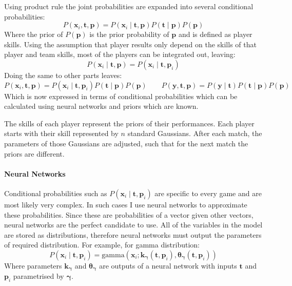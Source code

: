 \documentclass[12pt,a4paper]{book}
\newcommand\bs[1]{\boldsymbol{#1}}
\begin{document}
Using product rule the joint probabilities are expanded into several conditional probabilities:
\begin{equation*}
P(\bs{x}_i,\bs{t},\bs{p}) = P(\bs{x}_i\mid\bs{t},\bs{p})P(\bs{t}\mid\bs{p})P(\bs{p})
\end{equation*}
Where the prior of $P(\bs{p})$ is the prior probability of $\bs{p}$ and is defined as player skills.
Using the assumption that player results only depend on the skills of that player and team skills, most of the players can be integrated out, leaving:
\begin{equation*}
P(\bs{x}_i\mid\bs{t},\bs{p}) = P(\bs{x}_i\mid\bs{t},\bs{p}_i)
\end{equation*}
Doing the same to other parts leaves:
\begin{equation}
P(\bs{x}_i,\bs{t},\bs{p}) = P(\bs{x}_i\mid\bs{t},\bs{p}_i)P(\bs{t}\mid\bs{p})P(\bs{p})\qquad
P(\bs{y},\bs{t},\bs{p}) = P(\bs{y}\mid\bs{t})P(\bs{t}\mid\bs{p})P(\bs{p})
\label{eq:split-conditionals}
\end{equation}
Which is now expressed in terms of conditional probabilities which can be calculated using neural networks and priors which are known.

The skills of each player represent the priors of their performances.
Each player starts with their skill represented by $n$ standard Gaussians.
After each match, the parameters of those Gaussians are adjusted, such that for the next match the priors are different.

\paragraph{Neural Networks}
Conditional probabilities such as $P(\bs{x}_i\mid\bs{t},\bs{p}_i)$ are specific to every game and are most likely very complex.
In such cases I use neural networks to approximate these probabilities.
Since these are probabilities of a vector given other vectors, neural networks are the perfect candidate to use.
All of the variables in the model are stored as distributions, therefore neural networks must output the parameters of required distribution.
For example, for gamma distribution:
\begin{equation*}
P(\bs{x}_i \mid\bs{t},\bs{p}_i)=\text{gamma}(\bs{x}_i;\bs{k_\gamma}(\bs{t},\bs{p}_i), \bs{\theta_\gamma}(\bs{t},\bs{p}_i))
\end{equation*}
Where parameters $\bs{k_\gamma}$ and $\bs{\theta_\gamma}$ are outputs of a neural network with inputs $\bs{t}$ and $\bs{p}_i$ parametrised by $\bs{\gamma}$.
\end{document}
